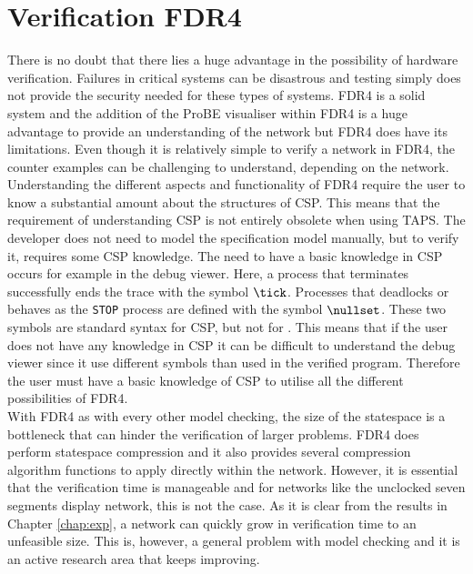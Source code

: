 \section{Verification FDR4}
There is no doubt that there lies a huge advantage in the possibility of hardware verification. Failures in critical systems can be disastrous and testing simply does not provide the security needed for these types of systems. FDR4 is a solid system and the addition of the ProBE visualiser within FDR4 is a huge advantage to provide an understanding of the network but FDR4 does have its limitations. Even though it is relatively simple to verify a network in FDR4, the counter examples can be challenging to understand, depending on the network. Understanding the different aspects and functionality of FDR4 require the user to know a substantial amount about the structures of CSP. This means that the requirement of understanding CSP is not entirely obsolete when using TAPS. The developer does not need to model the specification model manually, but to verify it, requires some CSP knowledge. The need to have a basic knowledge in CSP occurs for example in the debug viewer. Here, a process that terminates successfully ends the trace with the symbol $\tick$. Processes that deadlocks or behaves as the \texttt{STOP} process are defined with the symbol $\nullset$. These two symbols are standard syntax for CSP, but not for \cspm{}. This means that if the user does not have any knowledge in CSP it can be difficult to understand the debug viewer since it use different symbols than used in the verified \cspm{} program. Therefore the user must have a basic knowledge of CSP to utilise all the different possibilities of FDR4. \\

With FDR4 as with every other model checking, the size of the statespace is a bottleneck that can hinder the verification of larger problems. FDR4 does perform statespace compression and it also provides several compression algorithm functions to apply directly within the \cspm{} network.
However, it is essential that the verification time is manageable and for networks like the unclocked seven segments display network, this is not the case. As it is clear from the results in Chapter \ref{chap:exp}, a network can quickly grow in verification time to an unfeasible size. This is, however, a general problem with model checking and it is an active research area that keeps improving. 